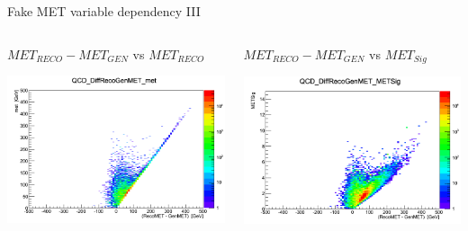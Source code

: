 \documentclass[8pt]{beamer}
\begin{document}
\begin{frame}{Fake MET variable dependency III}
 
\begin{columns}

\begin{block}{$MET_{RECO}-MET_{GEN}$ vs $MET_{RECO}$}

\centering
\includegraphics[width=\linewidth]{img/QCD_DiffRecoGenMET_met.png} 
 
\end{block}

\begin{block}{$MET_{RECO}-MET_{GEN}$ vs $MET_{Sig}$}

\centering
\includegraphics[width=\linewidth]{img/QCD_DiffRecoGenMET_METSig.png} 
 

\end{block}
\end{columns}
\end{frame}
\end{document}
